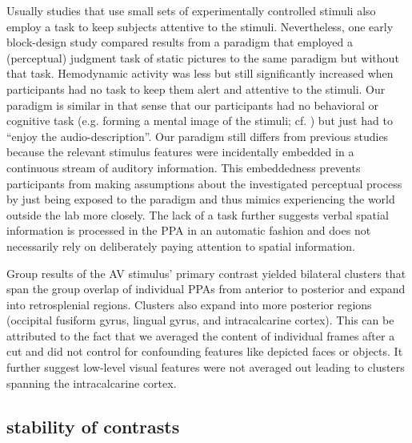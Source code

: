 \documentclass[english]{article}
\begin{document}
Usually studies that use small sets of experimentally controlled stimuli also
employ a task to keep subjects attentive to the stimuli.
Nevertheless, one early block-design study \citep{epstein1998ppa} compared
results from a paradigm that employed a (perceptual) judgment task of static
pictures to the same paradigm but without that task.
Hemodynamic activity was less but still significantly increased when
participants had no task to keep them alert and attentive to the stimuli.
Our paradigm is similar in that sense that our participants had no behavioral or
cognitive task (e.g. forming a mental image of the stimuli; cf.
\citep{ocraven2000mental})  but just had to ``enjoy the audio-description''.
Our paradigm still differs from previous studies because the relevant stimulus
features were incidentally embedded in a continuous stream of auditory
information.
This embeddedness prevents participants from making assumptions about the
investigated perceptual process by just being exposed to the paradigm and thus
mimics experiencing the world outside the lab more closely.
The lack of a task further suggests verbal spatial information is processed in
the PPA in an automatic fashion and does not necessarily rely on deliberately
paying attention to spatial information.

Group results of the AV stimulus' primary contrast yielded bilateral clusters
that span the group overlap of individual PPAs from anterior to posterior and
expand into retrosplenial regions.
Clusters also expand into more posterior regions (occipital fusiform gyrus,
lingual gyrus, and intracalcarine cortex).
This can be attributed to the fact that we averaged the content of individual
frames after a cut and did not control for confounding features like depicted
faces or objects.
It further suggest low-level visual features were not averaged out leading to
clusters spanning the intracalcarine cortex.


\subsection{stability of contrasts}
\end{document}
